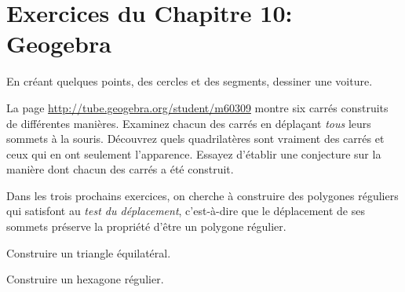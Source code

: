 
\section*{Exercices du Chapitre 10: Geogebra}


\begin{exercice}
En créant quelques points, des cercles et des segments, dessiner une voiture.
\end{exercice}

\begin{exercice}
La page \url{http://tube.geogebra.org/student/m60309} montre six carrés
construits de différentes manières.  Examinez chacun des carrés en déplaçant
\emph{tous} leurs sommets à la souris.  Découvrez quels quadrilatères sont
vraiment des carrés et ceux qui en ont seulement l’apparence.  Essayez d'établir
une conjecture sur la manière dont chacun des carrés a été construit.
\end{exercice}

Dans les trois prochains exercices, on cherche à construire des polygones
réguliers qui satisfont au \emph{test du déplacement}, c'est-à-dire que le
déplacement de ses sommets préserve la propriété d'être un polygone régulier.

\begin{exercice}
Construire un triangle équilatéral. 
\end{exercice}

\begin{exercice}
Construire un hexagone régulier.
\end{exercice}



